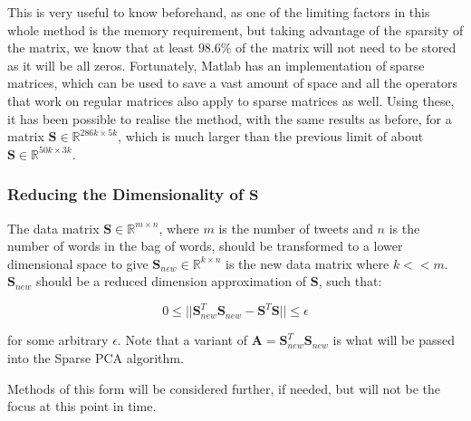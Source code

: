 \documentclass[11pt,a4paper]{article}
\begin{document}
This is very useful to know beforehand, as one of the limiting factors in this whole method is the memory requirement, but taking advantage of the sparsity of the matrix, we know that at least $98.6\%$ of the matrix will not need to be stored as it will be all zeros. Fortunately, Matlab has an implementation of sparse matrices, which can be used to save a vast amount of space and all the operators that work on regular matrices also apply to sparse matrices as well. Using these, it has been possible to realise the method, with the same results as before, for a matrix $\mathbf{S} \in \mathbb{R}^{286k\times5k}$, which is much larger than the previous limit of about $\mathbf{S} \in \mathbb{R}^{50k\times3k}$.

\subsubsection{Reducing the Dimensionality of $\mathbf{S}$}
The data matrix $\mathbf{S} \in \mathbb{R}^{m \times n}$, where $m$ is the number of tweets and $n$ is the number of words in the bag of words, should be transformed to a lower dimensional space to give $\mathbf{S}_{new} \in \mathbb{R}^{k \times n}$ is the new data matrix where $k << m$. $\mathbf{S}_{new}$ should be a reduced dimension approximation of  $\mathbf{S}$, such that:


\begin{equation*}
0 \le ||\mathbf{S}_{new}^T\mathbf{S}_{new} - \mathbf{S}^T\mathbf{S}|| \le \epsilon 
\end{equation*}

for some arbitrary $\epsilon$. Note that a variant of $\mathbf{A} = \mathbf{S}_{new}^T\mathbf{S}_{new}$ is what will be passed into the Sparse PCA algorithm. 

Methods of this form will be considered further, if needed, but will not be the focus at this point in time.

\end{document}
